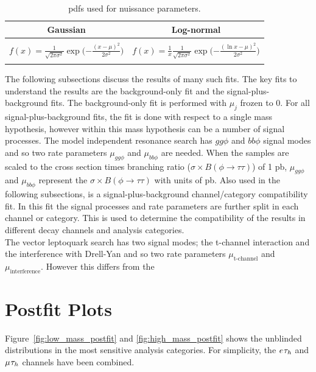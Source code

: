 \begin{table}[!hbtp]
    \centering
    \begin{tabular}{|c|c|}
         \hline
         Gaussian & Log-normal  \\
         \hline
         \hline
          & \\
         $f(x) = \frac{1}{\sqrt{2\pi\sigma^{2}}} \exp\Big({-\frac{(x - \mu)^2}{2\sigma^2}}\Big)$ & $f(x) = \frac{1}{x} \frac{1}{\sqrt{2\pi\sigma^{2}}} \exp\Big({-\frac{(\ln x - \mu)^2}{2\sigma^2}}\Big)$ \\
          & \\
         \hline
    \end{tabular}
    \caption{pdfs used for nuissance parameters.}
    \label{tab:pdfs}
\end{table}

The following subsections discuss the results of many such fits.
The key fits to understand the results are the background-only fit and the signal-plus-background fits.
The background-only fit is performed with $\mu_{j}$ frozen to 0.
For all signal-plus-background fits, the fit is done with respect to a single mass hypothesis, however within this mass hypothesis can be a number of signal processes.
The model independent resonance search has $gg\phi$ and $bb\phi$ signal modes and so two rate parameters $\mu_{gg\phi}$ and $\mu_{bb\phi}$ are needed.
When the samples are scaled to the cross section times branching ratio ($\sigma \times B (\phi\rightarrow\tau\tau)$) of 1 pb, $\mu_{gg\phi}$ and $\mu_{bb\phi}$ represent the $\sigma \times B (\phi\rightarrow\tau\tau)$ with units of pb.
Also used in the following subsections, is a signal-plus-background channel/category compatibility fit.
In this fit the signal processes and rate parameters are further split in each channel or category.
This is used to determine the compatibility of the results in different decay channels and analysis categories. \\

The vector leptoquark search has two signal modes; the t-channel interaction and the interference with Drell-Yan and so two rate parameters $\mu_{\text{t-channel}}$ and $\mu_{\text{interference}}$.
However this differs from the 



\newpage
\section{Postfit Plots}

Figure~\ref{fig:low_mass_postfit} and \ref{fig:high_mass_postfit} shows the unblinded distributions in the most sensitive analysis categories.
For simplicity, the $e_{}\tau_{h}$ and $\mu_{}\tau_{h}$ channels have been combined.

